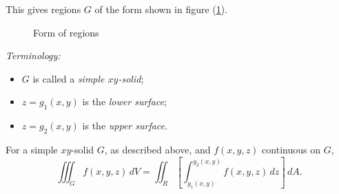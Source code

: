   This gives regions $G$ of the form shown in figure (\ref{tripleform}).
  \begin{figure}[!htbp]
    \centering
    \def\svgwidth{0.63\columnwidth}
    
    \caption{Form of regions}
    \label{tripleform}
  \end{figure}

  \emph{Terminology:}
    \begin{itemize}[topsep=0pt]
      \item $G$ is called a \emph{simple $xy$-solid};
      \item $z = g_1(x, y)$ is the \emph{lower surface};
      \item $z = g_2(x, y)$ is the \emph{upper surface}.
    \end{itemize}

  \begin{theorem}
    For a simple $xy$-solid $G$, as described above, and $f(x, y, z)$ continuous on $G$,
      \[
        \iiint_G f(x, y, z) \, dV = \iint_R \left[\int_{g_1(x, y)}^{g_2(x, y)} f(x, y, z) \, dz \right] \, dA.
      \]
  \end{theorem}

